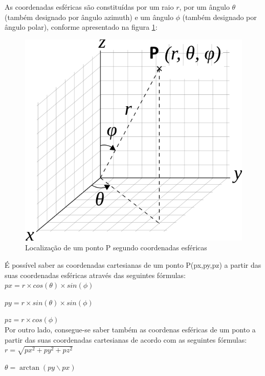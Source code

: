 As coordenadas esféricas são constituídas por um raio $r$, por um ângulo $\theta$ (também designado por ângulo azimuth) e um ângulo $\phi$ (também designado por ângulo polar), conforme apresentado na figura \ref{p1:fig:p1_sphericalCoords}:

\begin{figure}[<+htpb+>]
	\centering
	\includegraphics[scale=0.5]{imagens/p1_sphericalCoords.png}
	\caption{Localização de um ponto P segundo coordenadas esféricas}
	\label{p1:fig:p1_sphericalCoords}
\end{figure}

É possível saber as coordenadas cartesianas de um ponto P(px,py,pz) a partir das suas coordenadas esféricas através das seguintes fórmulas:\\

		$px = r \times cos(\theta) \times sin(\phi)$
		
		$py = r \times sin(\theta) \times sin(\phi) $
		
		$pz = r \times cos(\phi)$\\


Por outro lado, consegue-se saber também as coordenas esféricas de um ponto a partir das suas coordenadas cartesianas de acordo com as seguintes fórmulas:\\

		$r = \sqrt{px^2 + py^2 + pz^2}$
		
		$\theta = \arctan(py \backslash px) $
		
